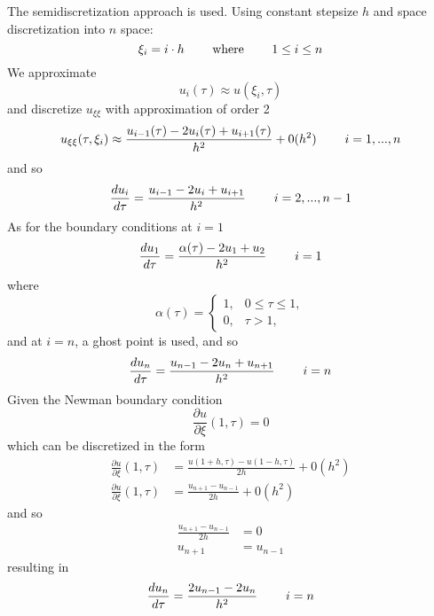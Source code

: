 \documentclass{article}
\begin{document}
The semidiscretization approach is used. Using constant stepsize $h$ and space discretization into $n$ space:
\begin{equation}
    \xi_i = i \cdot h \hspace{0.8cm} \text{where}  \hspace{0.8cm} 1 \leq i \leq n 
\end{equation}
We approximate
\begin{equation}
    u_i(\tau) \approx u(\xi_i,\tau)
\end{equation}
and discretize $u_{\xi \xi}$ with approximation of order 2
\begin{equation}
    u_{\xi \xi}(\tau,\xi_i) \approx \frac{u_{i-1}(\tau) - 2u_i(\tau) + u_{i+1}(\tau)}{h^2} + 0(h^2) \hspace{0.8cm} i = 1, ..., n
\end{equation}
and so
\begin{equation}
    \frac{d u_i}{d\tau} = \frac{u_{i-1} - 2u_i + u_{i+1}}{h^2}  \hspace{0.8cm} i = 2, ..., n-1
\end{equation}
As for the boundary conditions at $i = 1$
\begin{equation}
    \frac{d u_1}{d\tau} = \frac{\alpha(\tau) - 2u_1 + u_{2}}{h^2}  \hspace{0.8cm} i = 1
\end{equation}
where 
\begin{equation} 
  \alpha(\tau)= 
\begin{cases}
    1,           & 0 \leq \tau \leq 1, \\
    0,              & \tau > 1,
\end{cases}
\end{equation}
and at $i = n$, a ghost point is used, and so
\begin{equation}
    \frac{d u_n}{d\tau} = \frac{u_{n-1} - 2u_n + u_{n+1}}{h^2}  \hspace{0.8cm} i = n
\end{equation}
Given the Newman boundary condition
\begin{equation}
    \frac{\partial u}{\partial \xi} (1,\tau) = 0
\end{equation}
which can be discretized in the form
\begin{equation}
\begin{split}
        \frac{\partial u}{\partial \xi} (1,\tau) &= \frac{u(1+h,\tau)-u(1-h,\tau)}{2h} + 0(h^2)\\
         \frac{\partial u}{\partial \xi} (1,\tau) &= \frac{u_{n+1}-u_{n-1}}{2h} + 0(h^2)
\end{split}
\end{equation}
and so
\begin{equation}
\begin{split}
    \frac{u_{n+1}-u_{n-1}}{2h} &= 0 \\
    u_{n+1} &= u_{n-1}
\end{split}
\end{equation}
resulting in
\begin{equation}
    \frac{d u_n}{d\tau} = \frac{2u_{n-1} - 2u_n}{h^2}  \hspace{0.8cm} i = n
\end{equation}
\end{document}
